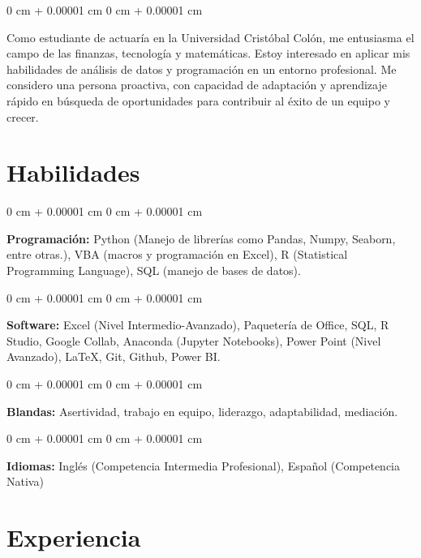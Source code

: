 \documentclass[10pt, letterpaper]{article}
\newenvironment{onecolentry}{
    \begin{adjustwidth}{
        0 cm + 0.00001 cm
    }{
        0 cm + 0.00001 cm
    }
}{
    \end{adjustwidth}
} %
\begin{document}
        \begin{onecolentry}
            Como estudiante de actuaría en la Universidad Cristóbal Colón, me entusiasma el campo de las finanzas, tecnología y matemáticas. Estoy interesado en aplicar mis habilidades de análisis de datos y programación en un entorno profesional. Me considero una persona proactiva, con capacidad de adaptación y aprendizaje rápido en búsqueda de oportunidades para contribuir al éxito de un equipo y crecer.
        \end{onecolentry}

    \section{Habilidades}

        \begin{onecolentry}
            \textbf{Programación:} Python (Manejo de librerías como Pandas, Numpy, Seaborn, entre otras.), VBA (macros y programación en Excel), R (Statistical Programming Language), SQL (manejo de bases de datos). 
        \end{onecolentry}

        \vspace{0.2 cm}

        \begin{onecolentry}
            \textbf{Software:} Excel (Nivel Intermedio-Avanzado), Paquetería de Office, SQL, R Studio, Google Collab, Anaconda (Jupyter Notebooks), Power Point (Nivel Avanzado), LaTeX, Git, Github, Power BI. 
        \end{onecolentry}

        \vspace{0.2 cm}

        \begin{onecolentry}
            \textbf{Blandas:} Asertividad, trabajo en equipo, liderazgo, adaptabilidad, mediación.
        \end{onecolentry}

        \vspace{0.2 cm}

        \begin{onecolentry}
            \textbf{Idiomas:} Inglés (Competencia Intermedia Profesional), Español (Competencia Nativa)
        \end{onecolentry}

    \section{Experiencia}
        
\end{document}
